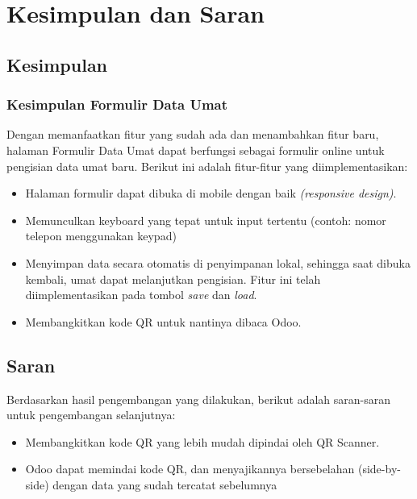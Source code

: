 \chapter{Kesimpulan dan Saran}
\label{chap:kesimpulandansaran}

\section{Kesimpulan}
\label{sec:kesimpulan}

\subsection{Kesimpulan Formulir Data Umat}
\label{sec:6:kesimpulanFormulir}

Dengan memanfaatkan fitur yang sudah ada dan menambahkan fitur baru, halaman Formulir Data Umat dapat berfungsi sebagai formulir online untuk pengisian data umat baru. Berikut ini adalah fitur-fitur yang diimplementasikan:
	
\begin{itemize}
	
	\item Halaman formulir dapat dibuka di mobile dengan baik \textit{(responsive design)}.
	\item Memunculkan keyboard yang tepat untuk input tertentu (contoh: nomor telepon menggunakan keypad)
	\item Menyimpan data secara otomatis di penyimpanan lokal, sehingga saat dibuka kembali, umat dapat melanjutkan pengisian. Fitur ini telah diimplementasikan pada tombol \textit{save} dan \textit{load}.
	\item Membangkitkan kode QR untuk nantinya dibaca Odoo.
\end{itemize}

\section{Saran}
\label{sec:saran}
Berdasarkan hasil pengembangan yang dilakukan, berikut adalah saran-saran untuk pengembangan selanjutnya:

\begin{itemize}
	\item Membangkitkan kode QR yang lebih mudah dipindai oleh QR Scanner.
	\item Odoo dapat memindai kode QR, dan menyajikannya bersebelahan (side-by-side) dengan data yang sudah tercatat sebelumnya
\end{itemize}

